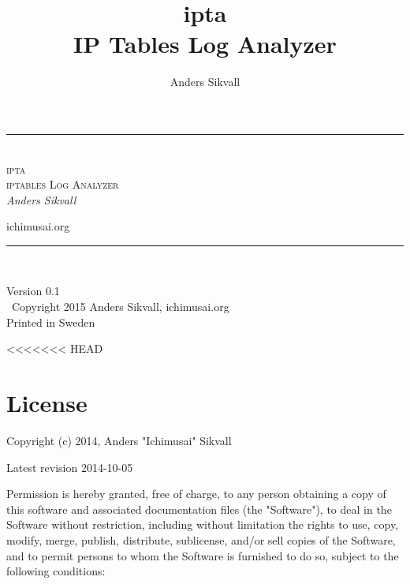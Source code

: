 \documentclass[english,twoside,openright,a4paper,12pt]{article}
\author{Anders Sikvall}
\title{
	\Huge ipta\\[2em]
	IP Tables Log Analyzer}
\newcommand{\titlerule}{\rule{\linewidth}{1pt}}
\begin{document}
\begin{titlepage}
	\thispagestyle{empty}
	\begin{center}
	\end{center}
	\begin{center}
		\titlerule\\[3mm]
		\Huge \textsc{ipta\\\Large iptables Log Analyzer}\\[5mm]
		\large \emph{Anders Sikvall}\\
		\begin{center}
			\normalsize ichimusai.org\\

		\end{center}
		\titlerule\\
	\end{center}
\end{titlepage}

\null\vfill\thispagestyle{empty}
\noindent

\begin{center}
	Version 0.1\\[5mm] \textcopyright\ Copyright 2015 Anders Sikvall, 
	ichimusai.org\\
	Printed in Sweden
	\newpage
\end{center}

\cleardoublepage

\tableofcontents

<<<<<<< HEAD
\chapter*{License}
\label{license}

Copyright (c) 2014, Anders "Ichimusai" Sikvall 

Latest revision 2014-10-05 
 
Permission is hereby granted, free of charge, to any person obtaining a copy of this software and associated documentation files (the "Software"), to deal in the Software without restriction, including without limitation the rights to use, copy, modify, merge, publish, distribute, sublicense, and/or sell copies of the Software, and to permit persons to whom the Software is furnished to do so, subject to the following conditions:  
\end{document}
